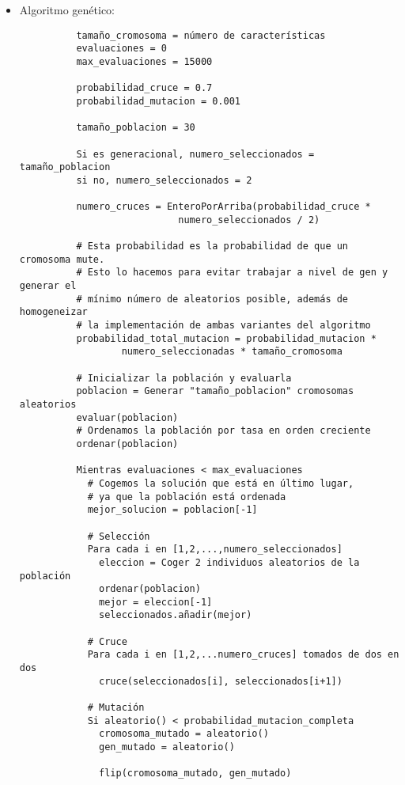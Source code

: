 \documentclass[a4paper, 11pt]{article}
\begin{document}
    \begin{itemize}
      \item Algoritmo genético:
        \begin{verbatim}
          tamaño_cromosoma = número de características
          evaluaciones = 0
          max_evaluaciones = 15000

          probabilidad_cruce = 0.7
          probabilidad_mutacion = 0.001

          tamaño_poblacion = 30

          Si es generacional, numero_seleccionados = tamaño_poblacion
          si no, numero_seleccionados = 2

          numero_cruces = EnteroPorArriba(probabilidad_cruce *
                            numero_seleccionados / 2)

          # Esta probabilidad es la probabilidad de que un cromosoma mute.
          # Esto lo hacemos para evitar trabajar a nivel de gen y generar el
          # mínimo número de aleatorios posible, además de homogeneizar
          # la implementación de ambas variantes del algoritmo
          probabilidad_total_mutacion = probabilidad_mutacion *
                  numero_seleccionadas * tamaño_cromosoma

          # Inicializar la población y evaluarla
          poblacion = Generar "tamaño_poblacion" cromosomas aleatorios
          evaluar(poblacion)
          # Ordenamos la población por tasa en orden creciente
          ordenar(poblacion)

          Mientras evaluaciones < max_evaluaciones
            # Cogemos la solución que está en último lugar,
            # ya que la población está ordenada
            mejor_solucion = poblacion[-1]

            # Selección
            Para cada i en [1,2,...,numero_seleccionados]
              eleccion = Coger 2 individuos aleatorios de la población
              ordenar(poblacion)
              mejor = eleccion[-1]
              seleccionados.añadir(mejor)

            # Cruce
            Para cada i en [1,2,...numero_cruces] tomados de dos en dos
              cruce(seleccionados[i], seleccionados[i+1])

            # Mutación
            Si aleatorio() < probabilidad_mutacion_completa
              cromosoma_mutado = aleatorio()
              gen_mutado = aleatorio()

              flip(cromosoma_mutado, gen_mutado)


\end{verbatim}
\end{itemize}
\end{document}
